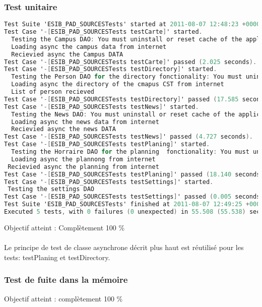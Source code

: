 		 		 \subsubsection*{Test unitaire}
		 		 \begin{lstlisting}[language=C,caption = Log des test unitaires]
Test Suite 'ESIB_PAD_SOURCESTests' started at 2011-08-07 12:48:23 +0000
Test Case '-[ESIB_PAD_SOURCESTests testCarte]' started.
  Testing the Campus DAO: You must uninstall or reset cache of the application before testing
  Loading async the campus data from internet
  Recievied async the Campus DATA
Test Case '-[ESIB_PAD_SOURCESTests testCarte]' passed (2.025 seconds).
Test Case '-[ESIB_PAD_SOURCESTests testDirectory]' started.
  Testing the Person DAO for the directory fonctionality: You must uninstall or reset cache of the application before testing
  Loading async the directory of the cmapus CST from internet
  List of person recieved
Test Case '-[ESIB_PAD_SOURCESTests testDirectory]' passed (17.585 seconds).
Test Case '-[ESIB_PAD_SOURCESTests testNews]' started.
  Testing the News DAO: You must uninstall or reset cache of the application before testing
  Loading async the news data from internet
  Recievied async the news DATA
Test Case '-[ESIB_PAD_SOURCESTests testNews]' passed (4.727 seconds).
Test Case '-[ESIB_PAD_SOURCESTests testPlaning]' started.
  Testing the Horraire DAO for the planning  fonctionality: You must uninstall or reset cache of the application before testing
  Loading async the plannong from internet
 Recievied async the planning from internet
Test Case '-[ESIB_PAD_SOURCESTests testPlaning]' passed (18.140 seconds).
Test Case '-[ESIB_PAD_SOURCESTests testSettings]' started.
 Testing the settings DAO
Test Case '-[ESIB_PAD_SOURCESTests testSettings]' passed (0.005 seconds).
Test Suite 'ESIB_PAD_SOURCESTests' finished at 2011-08-07 12:49:25 +0000.
Executed 5 tests, with 0 failures (0 unexpected) in 55.508 (55.538) seconds
		 		 \end{lstlisting}
		 		Objectif atteint : {\color{green}Complètement 100 \% \CheckedBox}\\
		 		\\
		 		Le principe de test de classe asynchrone décrit plus haut est réutilisé pour les tests: testPlaning et testDirectory.
		 		 \subsubsection*{Test de fuite dans la mémoire}
		 		 Objectif atteint : {\color{green}complètement 100 \% \CheckedBox}\\


